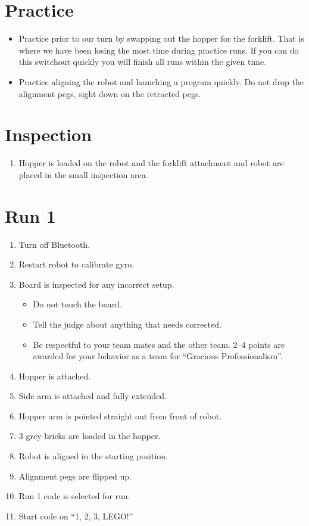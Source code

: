 \documentclass[letter, article]{article}
\begin{document}
\section{Practice}

\begin{itemize} \footnotesize
    \item Practice prior to our turn by swapping out the hopper for the forklift.  That is where we have been losing the most time during practice runs.  If you can do this switchout quickly you will finish all runs within the given time.
    \item Practice aligning the robot and launching a program quickly.  Do not drop the alignment pegs, sight down on the retracted pegs.
\end{itemize}

\section{Inspection}

\begin{enumerate} \footnotesize
    \item Hopper is loaded on the robot and the forklift attachment and robot are placed in the small inspection area.
\end{enumerate}

\section{Run 1}

\begin{enumerate}\footnotesize
    \item Turn off Bluetooth.
    \item Restart robot to calibrate gyro.
    \item Board is inspected for any incorrect setup.
        \begin{itemize} \footnotesize
            \item Do not touch the board.
            \item Tell the judge about anything that needs corrected.
            \item Be respectful to your team mates and the other team.  2--4 points are awarded for your behavior as a team for ``Gracious Professionalism''.
        \end{itemize}
    \item Hopper is attached.
    \item Side arm is attached and fully extended.
    \item Hopper arm is pointed straight out from front of robot.
    \item 3 grey bricks are loaded in the hopper.
    \item Robot is aligned in the starting position.
    \item Alignment pegs are flipped up.
    \item Run 1 code is selected for run.
    \item Start code on ``1, 2, 3, LEGO!''
\end{enumerate}
\end{document}
